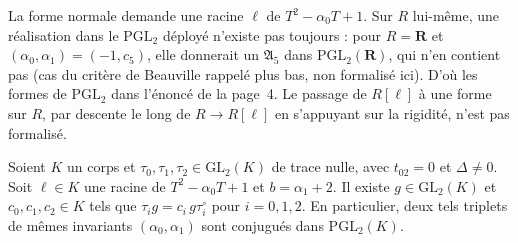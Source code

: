 \begin{remarque}
La forme normale demande une racine $\ell$ de $T^2 - \alpha_0 T + 1$. Sur $R$ lui-même, une réalisation dans le $\mathrm{PGL}_2$ déployé n'existe pas toujours : pour $R = \mathbf R$ et $(\alpha_0, \alpha_1) = (-1, c_5)$, elle donnerait un $\mathfrak A_5$ dans $\mathrm{PGL}_2(\mathbf R)$, qui n'en contient pas (cas du critère de Beauville rappelé plus bas, non formalisé ici). D'où les formes de $\mathrm{PGL}_2$ dans l'énoncé de la page~4. Le passage de $R[\ell]$ à une forme sur $R$, par descente le long de $R \to R[\ell]$ en s'appuyant sur la rigidité, n'est pas formalisé.
\end{remarque}

\begin{enonce}
Soient $K$ un corps et $\tau_0, \tau_1, \tau_2 \in \mathrm{GL}_2(K)$ de trace nulle, avec $t_{02} = 0$ et $\Delta \neq 0$. Soit $\ell \in K$ une racine de $T^2 - \alpha_0 T + 1$ et $b = \alpha_1 + 2$. Il existe $g \in \mathrm{GL}_2(K)$ et $c_0, c_1, c_2 \in K$ tels que $\tau_i g = c_i\, g\tau_i^\circ$ pour $i = 0, 1, 2$. En particulier, deux tels triplets de mêmes invariants $(\alpha_0, \alpha_1)$ sont conjugués dans $\mathrm{PGL}_2(K)$.
\end{enonce}

